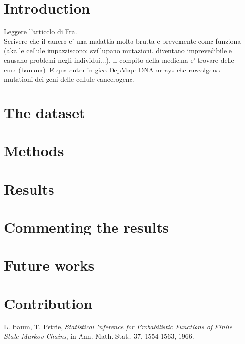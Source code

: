 \documentclass[a4paper,10pt, oneside]{article}  %
\begin{document}
\begin{multicols}{2}

\section{Introduction}
Leggere l'articolo di Fra. \\
Scrivere che il cancro e' una malattia molto brutta e brevemente come funziona (aka le cellule impazziscono: svillupano mutazioni, diventano imprevedibile e causano problemi negli individui...). Il compito della medicina e' trovare delle cure (banana). E qua entra in gico DepMap: DNA arrays che raccolgono mutationi dei geni delle cellule cancerogene.

\section{The dataset}


\section{Methods}


\section{Results}


\section{Commenting the results}


\section{Future works}


\section{Contribution}


\end{multicols}

\begin{thebibliography}{11}   %
 L. Baum, T. Petrie, \textit{Statistical Inference for Probabilistic Functions of Finite State Markov Chains}, in Ann. Math. Stat., 37, 1554-1563, 1966.
\end{thebibliography}
\end{document}
